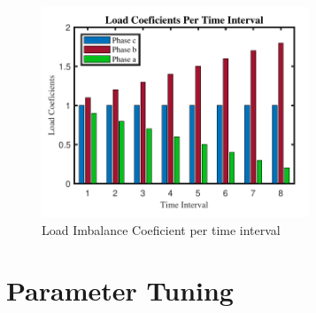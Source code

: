 \documentclass[journal]{IEEEtran}
\begin{document}
\begin{center}
\begin{figure}
\hspace*{0cm}
\centering
\includegraphics[width=8cm]{pdf/Load Imbalance.pdf}
\vspace*{-0.7cm}
\caption{ Load Imbalance Coeficient per time interval}

\label{Load Imbalance}
\end{figure}
\end{center}
\section{Parameter Tuning} \label{PT}
\end{document}
